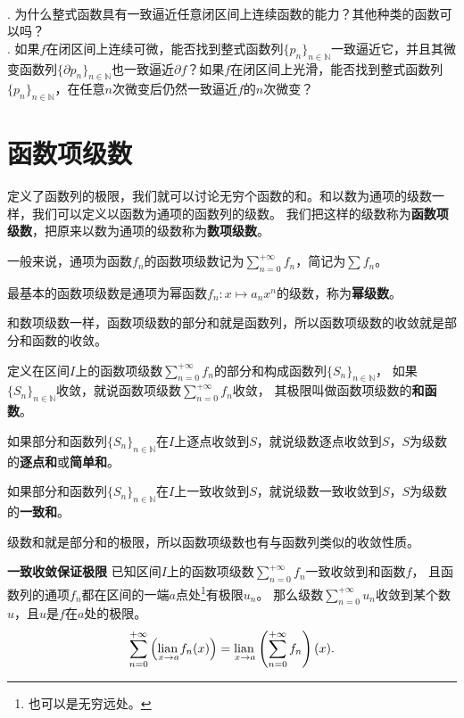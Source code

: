\documentclass[12pt,UTF8,fontset=none]{ctexbook}
\begin{document}
\begin{sk}
    \mbox{} \\
    . 为什么整式函数具有一致逼近任意闭区间上连续函数的能力？其他种类的函数可以吗？\\
    . 如果$f$在闭区间上连续可微，能否找到整式函数列$\{p_n\}_{n\in\mathbb{N}}$一致逼近它，并且其微变函数列$\{\partial p_n\}_{n\in\mathbb{N}}$也一致逼近$\partial f$？如果$f$在闭区间上光滑，能否找到整式函数列$\{p_n\}_{n\in\mathbb{N}}$，在任意$n$次微变后仍然一致逼近$f$的$n$次微变？
\end{sk}

\section{函数项级数}

定义了函数列的极限，我们就可以讨论无穷个函数的和。和以数为通项的级数一样，我们可以定义以函数为通项的函数列的级数。
我们把这样的级数称为\textbf{函数项级数}，把原来以数为通项的级数称为\textbf{数项级数}。

一般来说，通项为函数$f_n$的函数项级数记为$\sum_{n=0}^{+\infty} f_n$，简记为$\sum f_n$。

最基本的函数项级数是通项为幂函数$f_n: x\mapsto a_n x^n$的级数，称为\textbf{幂级数}。

和数项级数一样，函数项级数的部分和就是函数列，所以函数项级数的收敛就是部分和函数的收敛。

定义在区间$I$上的函数项级数$\sum_{n=0}^{+\infty} f_n$的部分和构成函数列$\{S_n\}_{n\in\mathbb{N}}$，
如果$\{S_n\}_{n\in\mathbb{N}}$收敛，就说函数项级数$\sum_{n=0}^{+\infty} f_n$收敛，
其极限叫做函数项级数的\textbf{和函数}。

如果部分和函数列$\{S_n\}_{n\in\mathbb{N}}$在$I$上逐点收敛到$S$，就说级数逐点收敛到$S$，$S$为级数的\textbf{逐点和}或\textbf{简单和}。

如果部分和函数列$\{S_n\}_{n\in\mathbb{N}}$在$I$上一致收敛到$S$，就说级数一致收敛到$S$，$S$为级数的\textbf{一致和}。

级数和就是部分和的极限，所以函数项级数也有与函数列类似的收敛性质。

\begin{tm}{\textbf{一致收敛保证极限}}
    已知区间$I$上的函数项级数$\sum_{n=0}^{+\infty} f_n$一致收敛到和函数$f$，
    且函数列的通项$f_n$都在区间的一端$a$点处\footnote{也可以是无穷远处。}有极限$u_n$。
    那么级数$\sum_{n=0}^{+\infty} u_n$收敛到某个数$u$，且$u$是$f$在$a$处的极限。
    $$ \sum_{n=0}^{+\infty} \left(\underset{x\to a}{\operatorname{lian}\,} f_n(x) \right) = \underset{x\to a}{\operatorname{lian}\,} \left(\sum_{n=0}^{+\infty} f_n\right)(x). $$
\end{tm}
\end{document}

